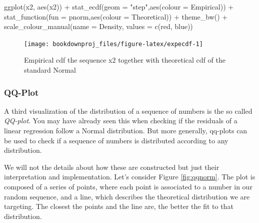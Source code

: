 \documentclass[
]{book}
\newenvironment{Shaded}{\begin{snugshade}}{\end{snugshade}}
\newcommand{\AttributeTok}[1]{\textcolor[rgb]{0.77,0.63,0.00}{#1}}
\newcommand{\FunctionTok}[1]{\textcolor[rgb]{0.00,0.00,0.00}{#1}}
\newcommand{\NormalTok}[1]{#1}
\newcommand{\SpecialCharTok}[1]{\textcolor[rgb]{0.00,0.00,0.00}{#1}}
\newcommand{\StringTok}[1]{\textcolor[rgb]{0.31,0.60,0.02}{#1}}
\theoremstyle{definition}
\theoremstyle{definition}
\theoremstyle{definition}
\theoremstyle{definition}
\theoremstyle{remark}
\begin{document}
\begin{Shaded}
\begin{Highlighting}[]
\FunctionTok{ggplot}\NormalTok{(x2, }\FunctionTok{aes}\NormalTok{(x2)) }\SpecialCharTok{+}
   \FunctionTok{stat\_ecdf}\NormalTok{(}\AttributeTok{geom =} \StringTok{"step"}\NormalTok{,}\FunctionTok{aes}\NormalTok{(}\AttributeTok{colour =} \StringTok{\textquotesingle{}Empirical\textquotesingle{}}\NormalTok{)) }\SpecialCharTok{+}
   \FunctionTok{stat\_function}\NormalTok{(}\AttributeTok{fun =}\NormalTok{ pnorm,}\FunctionTok{aes}\NormalTok{(}\AttributeTok{colour =} \StringTok{\textquotesingle{}Theoretical\textquotesingle{}}\NormalTok{)) }\SpecialCharTok{+}
   \FunctionTok{theme\_bw}\NormalTok{() }\SpecialCharTok{+}      
   \FunctionTok{scale\_colour\_manual}\NormalTok{(}\AttributeTok{name =} \StringTok{\textquotesingle{}Density\textquotesingle{}}\NormalTok{, }\AttributeTok{values =} \FunctionTok{c}\NormalTok{(}\StringTok{\textquotesingle{}red\textquotesingle{}}\NormalTok{, }\StringTok{\textquotesingle{}blue\textquotesingle{}}\NormalTok{))}
\end{Highlighting}
\end{Shaded}

\begin{figure}

{\centering \texttt{[image: bookdownproj\_files/figure-latex/expecdf-1]} 

}

\caption{Empirical cdf the sequence x2 together with theoretical cdf of the standard Normal}\label{fig:expecdf}
\end{figure}

\hypertarget{qq-plot}{%
\subsubsection{QQ-Plot}\label{qq-plot}}

A third visualization of the distribution of a sequence of numbers is the so called \emph{QQ-plot}. You may have already seen this when checking if the residuals of a linear regression follow a Normal distribution. But more generally, qq-plots can be used to check if a sequence of numbers is distributed according to any distribution.

We will not the details about how these are constructed but just their interpretation and implementation. Let's consider Figure \ref{fig:qqnorm}. The plot is composed of a series of points, where each point is associated to a number in our random sequence, and a line, which describes the theoretical distribution we are targeting. The closest the points and the line are, the better the fit to that distribution.
\end{document}
